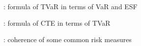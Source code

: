 \subsection*{}
\item {}: formula of TVaR in terms of VaR and ESF
\item {}: formula of CTE in terms of TVaR
\item {}: coherence of some common risk measures

